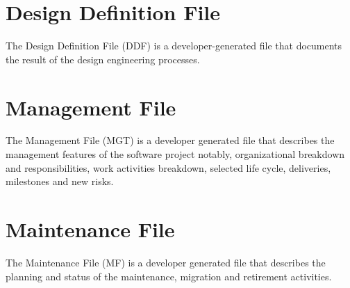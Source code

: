\chapter{Design Definition File}\label{sec:DDF}
The Design Definition File (DDF) is a developer-generated file that
documents the result of the design engineering processes.


\chapter{Management File}\label{sec:MGT}
The Management File (MGT) is a developer generated file
that describes the management features of the software project notably,
organizational breakdown and responsibilities, work activities breakdown,
selected life cycle, deliveries, milestones and new risks.


\chapter{Maintenance File}\label{sec:MF}
The Maintenance File (MF) is a developer generated file
that describes the planning and status of the maintenance, migration and retirement activities.


